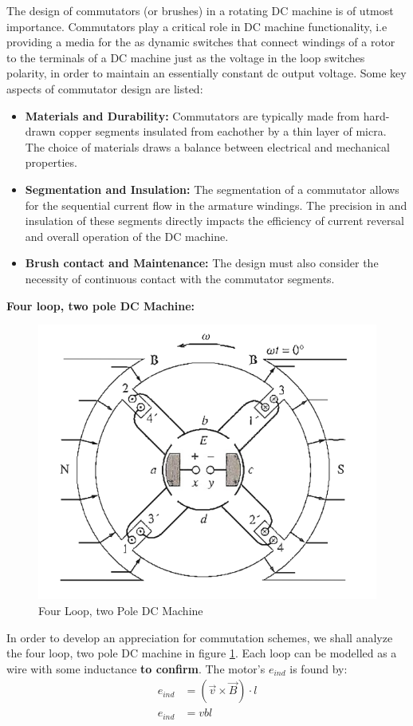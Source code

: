 \documentclass{book}
\begin{document}
The design of commutators (or brushes) in a rotating DC machine is of utmost importance. Commutators play a critical role in DC machine functionality, i.e providing a media for the as dynamic switches that connect windings of a rotor to the terminals of a DC machine just as the voltage in the loop switches polarity, in order to maintain an essentially constant dc output voltage. Some key aspects of commutator design are listed:

\begin{itemize}
	\item \textbf{Materials and Durability:} Commutators are typically made from hard-drawn copper segments insulated from eachother by a thin layer of micra. The choice of materials draws a balance between electrical and mechanical properties.
	\item \textbf{Segmentation and Insulation:} The segmentation of a commutator allows for the sequential current flow in the armature windings. The precision in and insulation of these segments directly impacts the efficiency of current reversal and overall operation of the DC machine.
	\item \textbf{Brush contact and Maintenance:} The design must also consider the necessity of continuous contact with the commutator segments. 
\end{itemize}

\textbf{Four loop, two pole DC Machine:}

\begin{figure}[h]
	\centering
	\includegraphics[width=0.3\linewidth]{Screenshots/four_loop_DC}
	\caption{Four Loop, two Pole DC Machine}
	\label{fig:fourloopdc}
\end{figure}

In order to develop an appreciation for commutation schemes, we shall analyze the four loop, two pole DC machine in figure \ref{fig:fourloopdc}. Each loop can be modelled as a wire with some inductance \textbf{to confirm}. The motor's $e_{ind}$ is found by:
\begin{align*}
	e_{ind} &= ( \vec{v} \times \vec{B}) \cdot l \\
	e_{ind} &= vbl
\end{align*}
\end{document}
